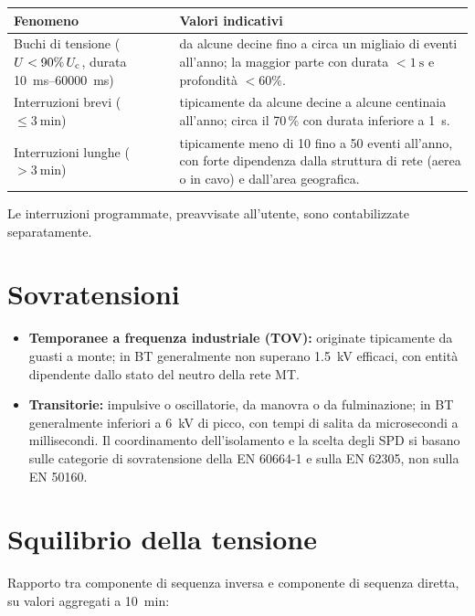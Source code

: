 \begin{table}[h]
\centering
\small
\begin{tabular}{p{}p{}}
\toprule
\textbf{Fenomeno} & \textbf{Valori indicativi} \\
\midrule
Buchi di tensione ($U < 90\%\,U_{\mathrm{c}}$, durata \SIrange{10}{60000}{ms}) &
da alcune decine fino a circa un migliaio di eventi all'anno; la maggior parte
con durata $<\SI{1}{\second}$ e profondità $<60\%$. \\
\addlinespace
Interruzioni brevi ($\le \SI{3}{\minute}$) &
tipicamente da alcune decine a alcune centinaia all'anno; circa il 70\,\% con
durata inferiore a \SI{1}{\second}. \\
\addlinespace
Interruzioni lunghe ($> \SI{3}{\minute}$) &
tipicamente meno di 10 fino a 50 eventi all'anno, con forte dipendenza dalla
struttura di rete (aerea o in cavo) e dall'area geografica. \\
\bottomrule
\end{tabular}
\end{table}

\noindent
Le interruzioni programmate, preavvisate all'utente, sono contabilizzate separatamente.

\section{Sovratensioni}

\begin{itemize}[itemsep=2pt]
  \item \textbf{Temporanee a frequenza industriale (TOV):} originate tipicamente da
        guasti a monte; in BT generalmente non superano \SI{1.5}{kV} efficaci, con
        entità dipendente dallo stato del neutro della rete MT.
  \item \textbf{Transitorie:} impulsive o oscillatorie, da manovra o da fulminazione;
        in BT generalmente inferiori a \SI{6}{kV} di picco, con tempi di salita
        da microsecondi a millisecondi. Il coordinamento dell'isolamento e la scelta
        degli SPD si basano sulle categorie di sovratensione della EN 60664-1
        e sulla EN 62305, non sulla EN 50160.
\end{itemize}

\section{Squilibrio della tensione}

Rapporto tra componente di sequenza inversa e componente di sequenza diretta,
su valori aggregati a \SI{10}{\minute}:

